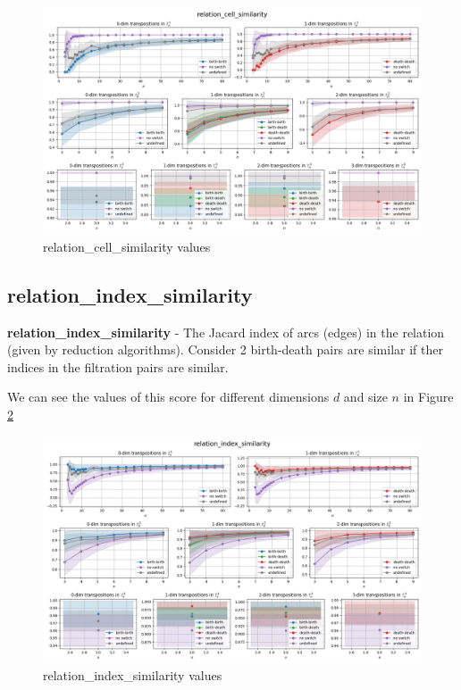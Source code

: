 \documentclass{article}
\begin{document}
\begin{figure}[h!]
    \centering
    \includegraphics[width=1.3\textwidth]{pics/torus-transpositions/similaritites/score=relation-cell-similarity.png}
    \caption{relation\_cell\_similarity values}
    \label{fig:relation-cell-similarity}
\end{figure}

\subsection{relation\_index\_similarity}
\par \textbf{relation\_index\_similarity} - The Jacard index of arcs (edges) in the relation (given by reduction algorithms).
    Consider 2 birth-death pairs are similar if ther indices in the filtration pairs are similar.
\par We can see the values of this score for different dimensions $d$ and size $n$ in Figure \ref{fig:relation-index-similarity}

\begin{figure}[h!]
    \centering
    \includegraphics[width=1.3\textwidth]{pics/torus-transpositions/similaritites/score=relation-index-similarity.png}
    \caption{relation\_index\_similarity values}
    \label{fig:relation-index-similarity}
\end{figure}
\end{document}
